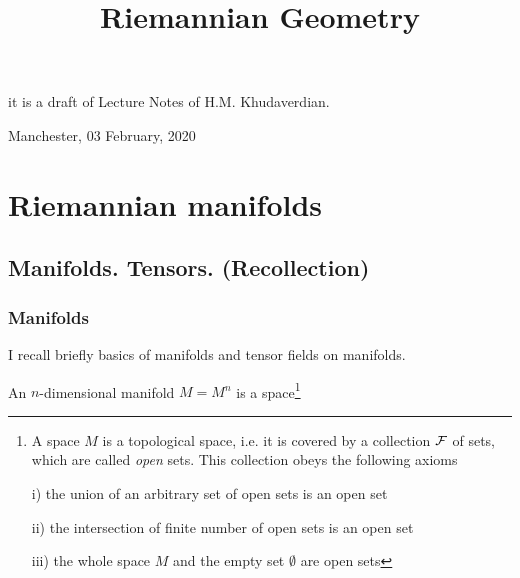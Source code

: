 \documentclass[12pt]{article}
\title{Riemannian Geometry}
\date{}
\theoremstyle{theorem}
\numberwithin{equation}{section}
\begin{document}
\maketitle

  \centerline {it is a draft of Lecture Notes of H.M. Khudaverdian.}

  \centerline { Manchester, 03 February,  2020}





\tableofcontents
{}
\newpage
{}




\section {Riemannian manifolds}


\subsection { Manifolds. Tensors. (Recollection)}

\subsubsection{Manifolds}



I recall briefly basics of manifolds 
and tensor fields on manifolds.

An $n$-dimensional manifold $M=M^n$ is a 
space\footnote
{A space $M$ is a topological space, i.e. it 
is covered by a collection $\cal F$ of sets,
which are called {\it open} sets.  This collection
obeys the following axioms

i) the union of an arbitrary set of open sets
is an open set

ii) the intersection of finite number of open sets
is an open set

iii) the whole space $M$ and the empty set 
$\emptyset$ are open sets
} 
\end{document}
